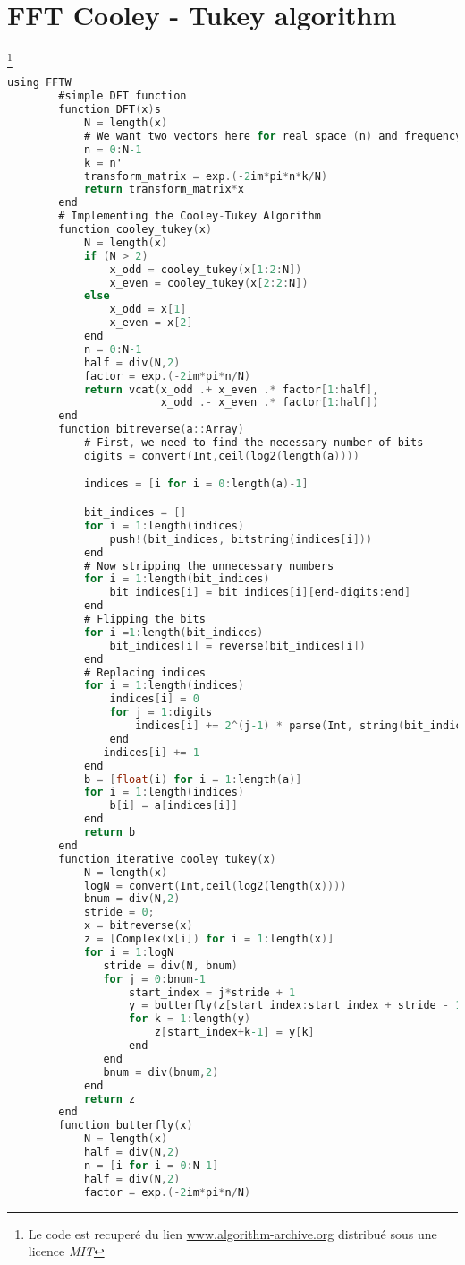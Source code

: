 

\label{ch:Appendix}

	\section{FFT Cooley - Tukey algorithm}\footnote{Le code est recuperé du lien \href{https://www.algorithm-archive.org/contents/cooley_tukey/cooley_tukey.html}{www.algorithm-archive.org} distribué sous une licence \textit{MIT}}
	\label{Cooley-Tukey_Code} 

	\begin{lstlisting}[language=C, caption= Algorithme de Cooley-Tukey avec des diagrammes papillon]
		using FFTW
		#simple DFT function
		function DFT(x)s
		    N = length(x)
		    # We want two vectors here for real space (n) and frequency space (k)
		    n = 0:N-1
		    k = n'
		    transform_matrix = exp.(-2im*pi*n*k/N)
		    return transform_matrix*x
		end
		# Implementing the Cooley-Tukey Algorithm
		function cooley_tukey(x)
		    N = length(x)
		    if (N > 2)
		        x_odd = cooley_tukey(x[1:2:N])
		        x_even = cooley_tukey(x[2:2:N])
		    else
		        x_odd = x[1]
		        x_even = x[2]
		    end
		    n = 0:N-1
		    half = div(N,2)
		    factor = exp.(-2im*pi*n/N)
		    return vcat(x_odd .+ x_even .* factor[1:half],
		                x_odd .- x_even .* factor[1:half])
		end
		function bitreverse(a::Array)
		    # First, we need to find the necessary number of bits
		    digits = convert(Int,ceil(log2(length(a))))

		    indices = [i for i = 0:length(a)-1]

		    bit_indices = []
		    for i = 1:length(indices)
		        push!(bit_indices, bitstring(indices[i]))
		    end
		    # Now stripping the unnecessary numbers
		    for i = 1:length(bit_indices)
		        bit_indices[i] = bit_indices[i][end-digits:end]
		    end
		    # Flipping the bits
		    for i =1:length(bit_indices)
		        bit_indices[i] = reverse(bit_indices[i])
		    end
		    # Replacing indices
		    for i = 1:length(indices)
		        indices[i] = 0
		        for j = 1:digits
		            indices[i] += 2^(j-1) * parse(Int, string(bit_indices[i][end-j]))
		        end
		       indices[i] += 1
		    end
		    b = [float(i) for i = 1:length(a)]
		    for i = 1:length(indices)
		        b[i] = a[indices[i]]
		    end
		    return b
		end
		function iterative_cooley_tukey(x)
		    N = length(x)
		    logN = convert(Int,ceil(log2(length(x))))
		    bnum = div(N,2)
		    stride = 0;
		    x = bitreverse(x)
		    z = [Complex(x[i]) for i = 1:length(x)]
		    for i = 1:logN
		       stride = div(N, bnum)
		       for j = 0:bnum-1
		           start_index = j*stride + 1
		           y = butterfly(z[start_index:start_index + stride - 1])
		           for k = 1:length(y)
		               z[start_index+k-1] = y[k]
		           end
		       end
		       bnum = div(bnum,2)
		    end
		    return z
		end
		function butterfly(x)
		    N = length(x)
		    half = div(N,2)
		    n = [i for i = 0:N-1]
		    half = div(N,2)
		    factor = exp.(-2im*pi*n/N)


\end{lstlisting}
